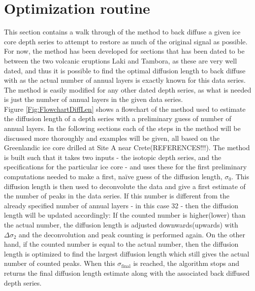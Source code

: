 \documentclass[../../CompleteThesis/Complete_1stDraft.tex]{subfiles}
\begin{document}
\section[Optimization routine]{Optimization routine}
This section contains a walk through of the method to back diffuse a given ice core depth series to attempt to restore as much of the original signal as possible. For now, the method has been developed for sections that has been dated to be between the two volcanic eruptions Laki and Tambora, as these are very well dated, and thus it is possible to find the optimal diffusion length to back diffuse with as the actual number of annual layers is exactly known for this data series. The method is easily modified for any other dated depth series, as what is needed is just the number of annual layers in the given data series.\\
Figure \ref{Fig:FlowchartDiffLen} shows a flowchart of the method used to estimate the diffusion length of a depth series with a preliminary guess of number of annual layers. In the following sections each of the steps in the method will be discussed more thoroughly and examples will be given, all based on the Greenlandic ice core drilled at Site A near Crete(REFERENCES!!!).
The method is built such that it takes two inputs - the isotopic depth series, and the specifications for the particular ice core - and uses these for the first preliminary computations needed to make a first, naïve guess of the diffusion length, $\sigma_0$.
This diffusion length is then used to deconvolute the data and give a first estimate of the number of peaks in the data series. If this number is different from the already specified number of annual layers - in this case 32 - then the diffusion length will be updated accordingly: If the counted number is higher(lower) than the actual number, the diffusion length is adjusted downwards(upwards) with $\Delta\sigma_2$ and the deconvolution and peak counting is performed again.
On the other hand, if the counted number is equal to the actual number, then the diffusion length is optimized to find the largest diffusion length which still gives the actual number of counted peaks. When this $\sigma_{\text{final}}$ is reached, the algorithm stops and returns the final diffusion length estimate along with the associated back diffused depth series.
\end{document}
